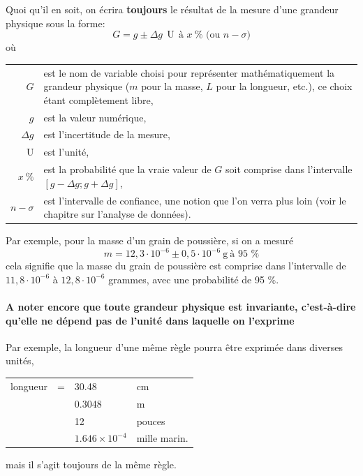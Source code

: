 \documentclass[main.tex]{subfiles}
\begin{document}
Quoi qu'il en soit, on écrira \textbf{toujours} le résultat de la mesure d'une grandeur physique sous la forme:
\begin{equation}
G = g \pm \Delta g\ \ \text{U}\ \ \text{à $x\ \%$ (ou $n\!-\!\sigma$)}
\end{equation}
où
\begin{center}
\begin{tabular}{r|p{}}
$G$ & est le nom de variable choisi pour représenter mathématiquement la grandeur physique ($m$ pour la masse, $L$ pour la longueur, etc.), ce choix étant complètement libre,\\
$g$ & est la valeur numérique,\\
$\Delta g$ & est l'incertitude de la mesure,\\
U & est l'unité,\\
$x\ \%$ & est la probabilité que la vraie valeur de $G$ soit comprise dans l'intervalle $[g-\Delta g;g+\Delta g]$,\\
$n\!-\!\sigma$ & est l'intervalle de confiance, une notion que l'on verra plus loin (voir le chapitre sur l'analyse de données).
\end{tabular}
\end{center}
Par exemple, pour la masse d'un grain de poussière, si on a mesuré
$$
m=12,3\cdot10^{-6}\pm0,5\cdot10^{-6}\ \text{g}\ \text{à 95 \%}
$$
cela signifie que la masse du grain de poussière est comprise dans l'intervalle de $11,8\cdot10^{-6}$ à $12,8\cdot10^{-6}$ grammes, avec une probabilité de 95 \%.

\paragraph{A noter encore que toute grandeur physique est invariante, c'est-à-dire qu'elle ne dépend pas de l'unité dans laquelle on l'exprime}

Par exemple, la longueur d'une même règle pourra être exprimée dans diverses unités,
\begin{center}
\begin{tabular}{lcll}
longueur  & = & 30.48 & cm\\
& & 0.3048 & m\\
& & 12 & pouces\\
& & $1.646\times10^{-4}$ & mille marin.
\end{tabular}
\end{center}
mais il s'agit toujours de la même règle.
\begin{center}
\end{center}
\end{document}

